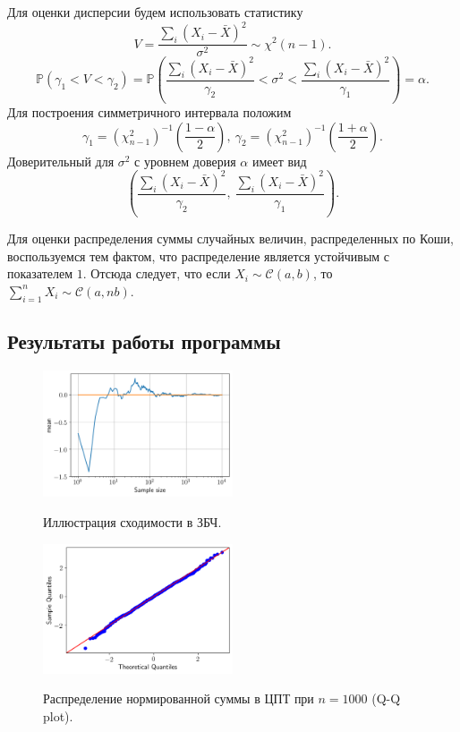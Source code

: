 \documentclass[12pt, a4paper]{article} %
\begin{document}
Для оценки дисперсии будем использовать статистику
$$V = \frac{\sum_i(X_i - \bar X)^2}{\sigma^2} \sim \chi^2(n - 1).$$
$$\mathbb{P}(\gamma_1 < V < \gamma_2) = \mathbb{P}\left(\frac{\sum_i(X_i - \bar X)^2}{\gamma_2} < \sigma^2 < \frac{\sum_i(X_i - \bar X)^2}{\gamma_1}\right) = \alpha.$$
Для построения симметричного интервала положим 
$$\gamma_1 = \left(\chi^2_{n-1}\right)^{-1}\left(\frac{1-\alpha}{2}\right), \ \gamma_2 = \left(\chi^2_{n-1}\right)^{-1}\left(\frac{1+\alpha}{2}\right).$$
Доверительный для $\sigma^2$ с уровнем доверия $\alpha$ имеет вид
$$\left(\frac{\sum_i(X_i - \bar X)^2}{\gamma_2}, \ \frac{\sum_i(X_i - \bar X)^2}{\gamma_1}\right).$$

Для оценки распределения суммы случайных величин, распределенных по Коши,
воспользуемся тем фактом, что распределение является устойчивым с показателем $1$.
Отсюда следует, что если $X_i \sim \mathcal{C}(a, b)$, то  
$\sum\limits_{i=1}^{n} X_i \sim \mathcal{C}(a, nb)$.

\subsection{Результаты работы программы}


\begin{figure}[H]
\begin{multicols}{2}
        \centering
        \includegraphics[width=0.5\textwidth]{figures/05_lln.png}
        \caption{Иллюстрация сходимости в ЗБЧ.}
        \label{fig:05_lln}
    \hfill
        \centering
        \includegraphics[width=0.5\textwidth]{figures/05_clt.png}
        \caption{Распределение нормированной суммы в ЦПТ при $n=1000$ (Q-Q plot).}
        \label{fig:05_clt}
\end{multicols} 
\end{figure}
\end{document}
